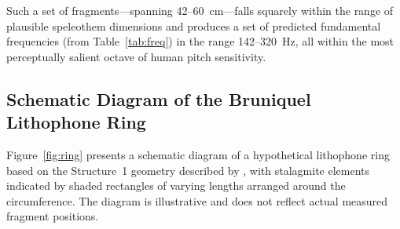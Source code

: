 \documentclass[12pt]{article}
\begin{document}
Such a set of fragments—spanning 42--60~cm—falls squarely within the range of plausible speleothem dimensions and produces a set of predicted fundamental frequencies (from Table~\ref{tab:freq}) in the range 142--320~Hz, all within the most perceptually salient octave of human pitch sensitivity.

\subsection*{Schematic Diagram of the Bruniquel Lithophone Ring}

Figure~\ref{fig:ring} presents a schematic diagram of a hypothetical lithophone ring based on the Structure~1 geometry described by \citet{Jaubert2016}, with stalagmite elements indicated by shaded rectangles of varying lengths arranged around the circumference. The diagram is illustrative and does not reflect actual measured fragment positions.
\end{document}
